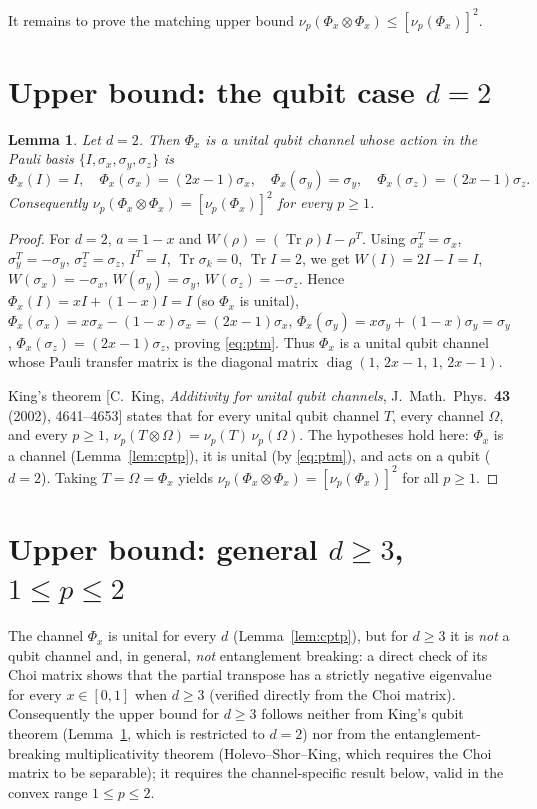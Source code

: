 \documentclass{amsart}
\newtheorem{lemma}{Lemma}
\theoremstyle{definition}
\DeclareMathOperator{\Tr}{Tr}
\begin{document}
It remains to prove the matching upper bound
$\nu_p(\Phi_x\otimes\Phi_x)\le[\nu_p(\Phi_x)]^{2}$.

\section{Upper bound: the qubit case $d=2$}

\begin{lemma}\label{lem:qubit}
Let $d=2$. Then $\Phi_x$ is a unital qubit channel whose action in the Pauli
basis $\{I,\sigma_x,\sigma_y,\sigma_z\}$ is
\begin{equation}\label{eq:ptm}
\Phi_x(I)=I,\quad
\Phi_x(\sigma_x)=(2x-1)\sigma_x,\quad
\Phi_x(\sigma_y)=\sigma_y,\quad
\Phi_x(\sigma_z)=(2x-1)\sigma_z .
\end{equation}
Consequently $\nu_p(\Phi_x\otimes\Phi_x)=[\nu_p(\Phi_x)]^{2}$ for every $p\ge1$.
\end{lemma}

\begin{proof}
For $d=2$, $a=1-x$ and $W(\rho)=(\Tr\rho)I-\rho^{T}$. Using
$\sigma_x^{T}=\sigma_x$, $\sigma_y^{T}=-\sigma_y$, $\sigma_z^{T}=\sigma_z$,
$I^{T}=I$, $\Tr\sigma_k=0$, $\Tr I=2$, we get $W(I)=2I-I=I$,
$W(\sigma_x)=-\sigma_x$, $W(\sigma_y)=\sigma_y$, $W(\sigma_z)=-\sigma_z$. Hence
$\Phi_x(I)=xI+(1-x)I=I$ (so $\Phi_x$ is unital),
$\Phi_x(\sigma_x)=x\sigma_x-(1-x)\sigma_x=(2x-1)\sigma_x$,
$\Phi_x(\sigma_y)=x\sigma_y+(1-x)\sigma_y=\sigma_y$,
$\Phi_x(\sigma_z)=(2x-1)\sigma_z$, proving \eqref{eq:ptm}. Thus $\Phi_x$ is a
unital qubit channel whose Pauli transfer matrix is the diagonal matrix
$\operatorname{diag}(1,\,2x-1,\,1,\,2x-1)$.

King's theorem [C.~King, \emph{Additivity for unital qubit channels},
J.~Math.\ Phys.\ \textbf{43} (2002), 4641--4653] states that for every unital
qubit channel $T$, every channel $\Omega$, and every $p\ge1$,
$\nu_p(T\otimes\Omega)=\nu_p(T)\,\nu_p(\Omega)$. The hypotheses hold here:
$\Phi_x$ is a channel (Lemma~\ref{lem:cptp}), it is unital (by \eqref{eq:ptm}),
and acts on a qubit ($d=2$). Taking $T=\Omega=\Phi_x$ yields
$\nu_p(\Phi_x\otimes\Phi_x)=[\nu_p(\Phi_x)]^{2}$ for all $p\ge1$.
\end{proof}

\section{Upper bound: general $d\ge3$, $1\le p\le2$}

The channel $\Phi_x$ is unital for every $d$ (Lemma~\ref{lem:cptp}), but for
$d\ge3$ it is \emph{not} a qubit channel and, in general, \emph{not}
entanglement breaking: a direct check of its Choi matrix shows that the partial
transpose has a strictly negative eigenvalue for every $x\in[0,1]$ when $d\ge3$
(verified directly from the Choi matrix). Consequently the upper bound for $d\ge3$ follows neither from King's
qubit theorem (Lemma~\ref{lem:qubit}, which is restricted to $d=2$) nor from the
entanglement-breaking multiplicativity theorem (Holevo--Shor--King, which
requires the Choi matrix to be separable); it requires the channel-specific
result below, valid in the convex range $1\le p\le 2$.
\end{document}
